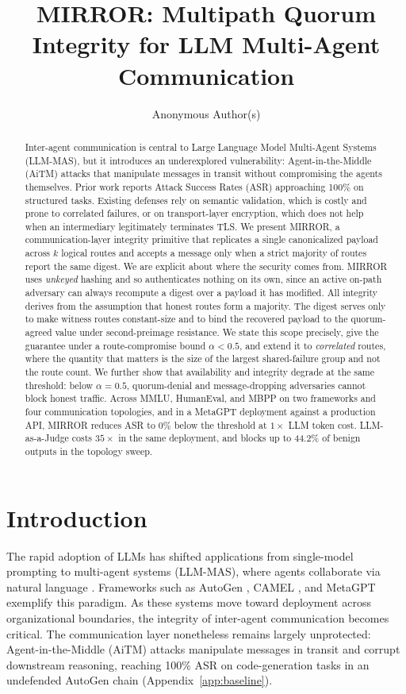\documentclass{article}
\title{MIRROR: Multipath Quorum Integrity for {LLM} Multi-Agent Communication}
\author{Anonymous Author(s)}
\begin{document}
\maketitle

\begin{abstract}
Inter-agent communication is central to Large Language Model Multi-Agent Systems (LLM-MAS), but it introduces an underexplored vulnerability: Agent-in-the-Middle (AiTM) attacks that manipulate messages in transit without compromising the agents themselves. Prior work reports Attack Success Rates (ASR) approaching 100\% on structured tasks. Existing defenses rely on semantic validation, which is costly and prone to correlated failures, or on transport-layer encryption, which does not help when an intermediary legitimately terminates TLS. We present MIRROR, a communication-layer integrity primitive that replicates a single canonicalized payload across $k$ logical routes and accepts a message only when a strict majority of routes report the same digest. We are explicit about where the security comes from. MIRROR uses \emph{unkeyed} hashing and so authenticates nothing on its own, since an active on-path adversary can always recompute a digest over a payload it has modified. All integrity derives from the assumption that honest routes form a majority. The digest serves only to make witness routes constant-size and to bind the recovered payload to the quorum-agreed value under second-preimage resistance. We state this scope precisely, give the guarantee under a route-compromise bound $\alpha < 0.5$, and extend it to \emph{correlated} routes, where the quantity that matters is the size of the largest shared-failure group and not the route count. We further show that availability and integrity degrade at the same threshold: below $\alpha = 0.5$, quorum-denial and message-dropping adversaries cannot block honest traffic. Across MMLU, HumanEval, and MBPP on two frameworks and four communication topologies, and in a MetaGPT deployment against a production API, MIRROR reduces ASR to 0\% below the threshold at $1\times$ LLM token cost. LLM-as-a-Judge costs $35\times$ in the same deployment, and blocks up to 44.2\% of benign outputs in the topology sweep.
\end{abstract}

\section{Introduction}

The rapid adoption of LLMs has shifted applications from single-model prompting to multi-agent systems (LLM-MAS), where agents collaborate via natural language \citep{wang2024survey, xi2023rise}. Frameworks such as AutoGen \citep{wu2023autogen}, CAMEL \citep{li2023camel}, and MetaGPT \citep{hong2023metagpt} exemplify this paradigm. As these systems move toward deployment across organizational boundaries, the integrity of inter-agent communication becomes critical. The communication layer nonetheless remains largely unprotected: Agent-in-the-Middle (AiTM) attacks manipulate messages in transit and corrupt downstream reasoning, reaching 100\% ASR on code-generation tasks in an undefended AutoGen chain (Appendix~\ref{app:baseline}).
\end{document}
